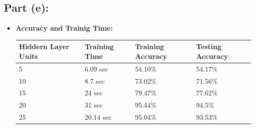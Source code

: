 \documentclass[a4 paper]{article}
\begin{document}


\subsection*{Part (e):}
\begin{itemize}
\item \textbf{Accuracy and Trainig Time:}

\hskip1.0cm\begin{tabular}{ |p{2.7cm}||p{2.5cm}|p{3.3cm}|p{3.3cm}|}
	 \hline
	 \hline \textbf{Hiddern Layer Units} & \textbf{Training Time} & \textbf{Training Accuracy} & \textbf{Testing Accuracy}\\
	 \hline
	 5 &  6.09 sec & 54.10\% &  54.17\% \\
	 10 & 8.7 sec & 73.02\% &  71.56\% \\
	 15 & 24 sec & 79.47\% &  77.62\% \\
	 20 & 31 sec & 95.44\% &  94.5\% \\
	 25 & 20.14 sec & 95.04\% &  93.53\% \\
	 \hline
\end{tabular}


\begin{figure}[H]
\centering
	\begin{floatrow}
	\hspace*{-0.9in}
\end{floatrow}
\end{figure}



\end{itemize}
\end{document}
